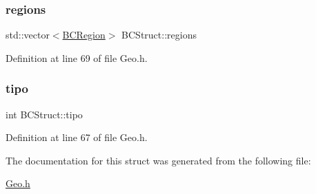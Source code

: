 \subsubsection{\texorpdfstring{regions}{regions}}
{\footnotesize\ttfamily std\+::vector$<$\hyperlink{structBCRegion}{B\+C\+Region}$>$ B\+C\+Struct\+::regions}



Definition at line 69 of file Geo.\+h.

\mbox{\label{structBCStruct_a501cb7bb8dc241cc7fe6f24ce23b4269}} 
\subsubsection{\texorpdfstring{tipo}{tipo}}
{\footnotesize\ttfamily int B\+C\+Struct\+::tipo}



Definition at line 67 of file Geo.\+h.



The documentation for this struct was generated from the following file\+:\begin{DoxyCompactItemize}
\item 
\hyperlink{Geo_8h}{Geo.\+h}\end{DoxyCompactItemize}
